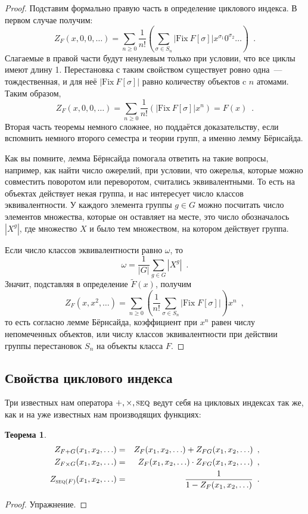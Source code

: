 \documentclass{article}
\def \seq {\text{\textsc{seq}}}
\theoremstyle{definition}
\newtheorem*{theorem}{Теорема}
\begin{document}
\begin{proof}
    Подставим формально правую часть в определение циклового индекса. В первом случае получим:
	\[
		Z_F(x, 0, 0, \ldots) = \sum_{n \geq 0} \dfrac{1}{n!} \left(
			\sum_{\sigma \in S_n} |\mathrm{Fix}\ F[\sigma]|x^{\sigma_1} 
			0^{\sigma_2} \ldots
		\right) \enspace .
	\]
    Слагаемые в правой части будут ненулевым только при условии, что все циклы имеют длину 1.
Перестановка с таким свойством существует ровно одна~--- тождественная, и для
неё \( |\mathrm{Fix}\ F[\sigma]| \) равно количеству объектов c \( n \) атомами. 
Таким образом,  
	\[
		Z_F(x, 0, 0, \ldots) = \sum_{n \geq 0} \dfrac{1}{n!} \left(
			 |\mathrm{Fix}\ F[\sigma]| x^n
            \right) = F(x) \enspace .
	\]
Вторая часть теоремы немного сложнее, но поддаётся доказательству, если
вспомнить немного второго семестра и теории групп, а именно лемму Бёрнсайда.

Как вы помните, лемма Бёрнсайда помогала ответить на такие вопросы, например,
как найти число ожерелий, при условии, что ожерелья, которые можно совместить
поворотом или переворотом, считались эквивалентными. То есть на объектах
действует некая группа, и нас интересует число классов эквивалентности. У
каждого элемента группы \( g \in G \) можно посчитать число элементов множества,
которые он оставляет на месте, это число обозначалось \( |X^g| \), где множество
\( X \) и было тем множеством, на котором действует группа.

Если число классов эквивалентности равно \( \omega \), то 
\[
	\omega = \dfrac{1}{|G|} \sum_{g \in G} |X^g| \enspace .
\]
Значит, подставляя в определение \( \widetilde F(x) \), получим
\[
	Z_F(x, x^2, \ldots) = \sum_{n \geq 0} \left(\dfrac{1}{n!} 
		\sum_{\sigma \in S_n} |\mathrm{Fix} \; F[\sigma]|
	\right) x^n \enspace ,
\]
то есть согласно лемме Бёрнсайда, коэффициент при \( x^n \) равен числу непомеченных объектов, или числу классов эквивалентности при действии группы перестановок \( S_n  \) на объекты класса \( F \).
\end{proof}


\subsection{Свойства циклового индекса}

Три известных нам оператора \( +, \times, \seq \) ведут себя на цикловых индексах так же, как и на уже известных нам производящих функциях:
\begin{theorem}
	\begin{eqnarray*}
		Z_{F + G}(x_1, x_2, \ldots) &=& Z_{F}(x_1, x_2, \ldots) + Z_{FG}(x_1, x_2, \ldots) \enspace , \\
		Z_{F \times G}(x_1, x_2, \ldots) &=& Z_{F}(x_1, x_2, \ldots) \cdot Z_{FG}(x_1, x_2, \ldots) \enspace , \\
		Z_{\seq(F)}(x_1, x_2, \ldots) &=& \dfrac{1}{1 - Z_{F}(x_1, x_2, \ldots)} \enspace .
	\end{eqnarray*}
\end{theorem}
\begin{proof}
	Упражнение.
\end{proof}
\end{document}
